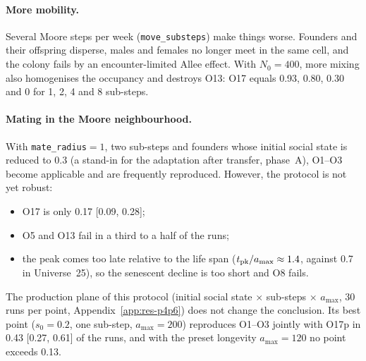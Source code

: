 \paragraph{More mobility.}
Several Moore steps per week (\texttt{move\_substeps}) make things worse. Founders and their offspring
disperse, males and females no longer meet in the same cell, and the colony fails by an encounter-limited
Allee effect. With $N_0=400$, more mixing also homogenises the occupancy and destroys O13: O17 equals
0.93, 0.80, 0.30 and 0 for 1, 2, 4 and 8 sub-steps.

\paragraph{Mating in the Moore neighbourhood.}
With \texttt{mate\_radius}${}=1$, two sub-steps and founders whose initial social state is reduced to
$0.3$ (a stand-in for the adaptation after transfer, phase~A), O1--O3 become applicable and are
frequently reproduced. However, the protocol is not yet robust:
\begin{itemize}
  \item O17 is only 0.17 [0.09, 0.28];
  \item O5 and O13 fail in a third to a half of the runs;
  \item the peak comes too late relative to the life span ($t_{\rm pk}/a_{\max}\approx1.4$, against 0.7
    in Universe~25), so the senescent decline is too short and O8 fails.
\end{itemize}
The production plane of this protocol (initial social state $\times$ sub-steps $\times$ $a_{\max}$, 30 runs
per point, Appendix~\ref{app:res-p4p6}) does not change the conclusion. Its best point ($s_0=0.2$, one
sub-step, $a_{\max}=200$) reproduces O1--O3 jointly with O17p in 0.43 [0.27, 0.61] of the runs, and with the preset
longevity $a_{\max}=120$ no point exceeds 0.13.

